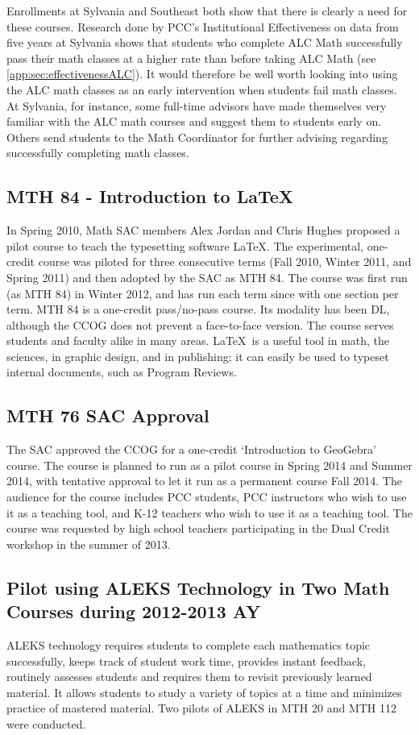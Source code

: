Enrollments at Sylvania and Southeast both show that there is clearly a need for
these courses.  Research done by PCC's Institutional Effectiveness on data from
five years at Sylvania shows that students who complete ALC Math successfully
pass their math classes at a higher rate than before taking ALC Math  (see
\vref{app:sec:effectivenessALC}).  It would therefore be well worth looking into
using the ALC math classes as an early intervention when students fail math classes.
At Sylvania, for instance, some
full-time advisors have made themselves very familiar with the ALC math courses and
suggest them to students early on.  Others send students to the Math Coordinator for
further advising regarding successfully completing math classes.
 
\subsection{MTH 84 - Introduction to \LaTeX}\label{other:sec:mth84}
In Spring 2010, Math SAC members Alex Jordan and Chris Hughes proposed a pilot
course to teach the typesetting software \LaTeX.  The experimental, one-credit course was piloted for
three consecutive terms (Fall 2010, Winter 2011, and Spring 2011) and then
adopted by the SAC as MTH 84.  The course was first run (as MTH 84) in Winter
2012, and has run each term since with one section per term. MTH 84 is a one-credit 
pass/no-pass course. Its modality has been DL, although the CCOG does not
prevent a face-to-face version.  The course serves students and faculty alike in many areas.
\LaTeX\ is a useful tool in math, the sciences, in graphic design, and in
publishing; it can easily be used to typeset internal documents, such as Program Reviews.
 
\subsection{MTH 76 SAC Approval}
The SAC approved the CCOG for a one-credit `Introduction to GeoGebra' course. The course is
planned to run as a pilot course in Spring 2014 and Summer 2014, with tentative
approval to let it run as a permanent course Fall 2014.  The audience for the
course includes PCC students, PCC instructors who wish to use it as a teaching
tool, and K-12 teachers who wish to use it as a teaching tool.  The course was
requested by high school teachers participating in the Dual Credit workshop in
the summer of 2013.

\subsection[ALEKS pilot]{Pilot using ALEKS Technology in Two Math Courses during 2012-2013 AY}\label{sec3:subset:alekspilot}
ALEKS technology requires students to complete each mathematics topic
successfully, keeps track of student work time, provides instant feedback,
routinely assesses students and requires them to revisit previously learned
material.  It allows students to study a variety of topics at a time and
minimizes practice of mastered material. Two pilots of ALEKS in MTH 20 and MTH
112 were conducted.

